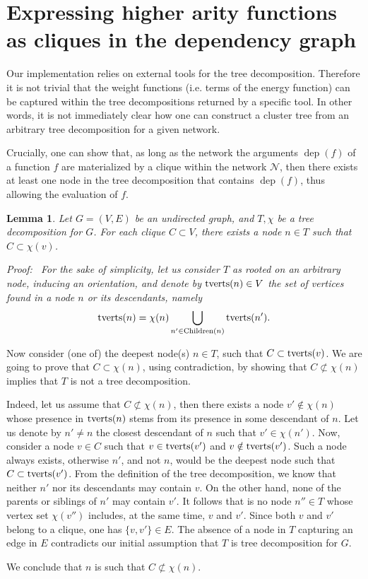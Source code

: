 \documentclass{bioinfo}
\newtheorem{lemma}[theorem]{Lemma}
\renewenvironment{proof}[1][]{\noindent \em Proof\ifthenelse{\equal{#1}{}}{}{ (#1)}:~}{}
\newcommand{\network}{\mathcal{N}}
\newcommand{\dep}{\operatorname{dep}}
\begin{document}
\section{Expressing higher arity functions as cliques in the dependency graph}
\label{appsec:dependency-cliques}

Our implementation relies on external tools for the tree decomposition. Therefore it is not trivial that the weight functions (i.e. terms of the energy function) can be captured within the tree decompositions returned by a specific tool. In other words, it is not immediately clear how one can construct a cluster tree from an arbitrary tree decomposition for a given network.

Crucially, one can show that, as long as the network the arguments $\dep(f)$ of a function $f$ are materialized by a clique within the network $\network$, then there exists at least one node in the tree decomposition that contains $\dep(f)$, thus allowing the evaluation of $f$.
\begin{lemma}\label{lem:cliques}
Let $G=(V,E)$ be an undirected graph, and  $T,\chi$ be a tree decomposition for $G$. For each clique $C\subset V$, there exists a node $n\in T$ such that $C\subset\chi(v)$.
\end{lemma}
\begin{proof}
  \newcommand{\TransVars}[1]{{\rm tverts}(#1)}
  \newcommand{\Children}[1]{{\rm Children}(#1)}
  For the sake of simplicity, let us consider $T$ as rooted on an arbitrary node, inducing an orientation, and denote by $\TransVars{n}\in V$ the set of vertices found in a node $n$ or its descendants, namely
    $$\TransVars{n} = \chi(n) \bigcup_{n'\in\Children{n}} \TransVars{n'}.$$

  Now consider (one of) the deepest node(s) $n\in T$, such that $C\subset\TransVars{v}$. We are going to prove that $C\subset\chi(n)$, using contradiction, by showing that $C\not\subset\chi(n)$ implies that $T$ is not a tree decomposition.

  Indeed, let us assume that $C\not\subset\chi(n)$, then there exists a node $v'\notin\chi(n)$ whose presence in $\TransVars{n}$ stems from its presence in some descendant of $n$. Let us denote by $n'\neq n$ the closest descendant of $n$ such that $v'\in\chi(n')$. Now, consider a node $v\in C$ such that $v\in \TransVars{v'}$ and $v\notin \TransVars{v'}$. Such a node always exists, otherwise $n'$, and not $n$, would be the deepest node such that $C\subset \TransVars{v'}$. From the definition of the tree decomposition, we know that neither $n'$ nor its descendants may contain $v$. On the other hand, none of the parents or siblings of $n'$ may contain $v'$. It follows that is no node $n''\in T$ whose vertex set $\chi(v'')$ includes, at the same time, $v$ and $v'$. Since both $v$ and $v'$ belong to a clique, one has $\{v,v'\}\in E$. The absence of a node in $T$ capturing an edge in $E$ contradicts our initial assumption that $T$ is tree decomposition for $G$.

  We conclude that $n$ is such that $C\not\subset\chi(n)$.
\end{proof}
\end{document}
